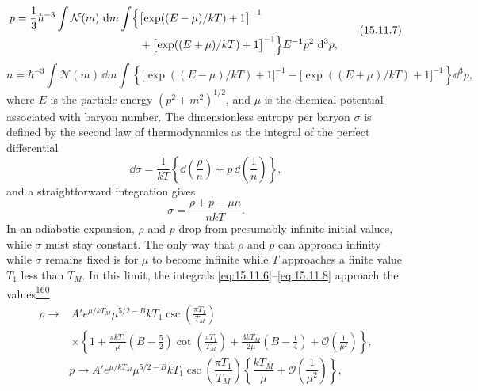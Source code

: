 \begin{equation}
  \begin{split}
  p
  =
  \frac13\hbar^{-3}
  \int\mathcal N(m)\,\mathop{}\!\mathrm{d} m
  \int
  \Bigl\{
    &\bigl[\exp((E-\mu)/kT)+1\bigr]^{-1}\\
    &+\bigl[\exp((E+\mu)/kT)+1\bigr]^{-1}
  \Bigr\}
  E^{-1}p^2\,\mathop{}\!\mathrm{d}^3p,
  \end{split}
  \tag{15.11.7}\label{eq:15.11.7}
\end{equation}
\begin{equation}
  n
  =
  \hbar^{-3}
  \int\mathcal N(m)\,\dd m
  \int
  \left\{
    \bigl[\exp((E-\mu)/kT)+1\bigr]^{-1}
    -\bigl[\exp((E+\mu)/kT)+1\bigr]^{-1}
  \right\}
  \dd^3p,
  \tag{15.11.8}\label{eq:15.11.8}
\end{equation}
where \(E\) is the particle energy \((p^2+m^2)^{1/2}\), and \(\mu\) is
the chemical potential associated with baryon number. The dimensionless
entropy per baryon \(\sigma\) is defined by the second law of thermodynamics
as the integral of the perfect differential
\[
  \dd\sigma
  =
  \frac1{kT}
  \left\{
    \dd\left(\frac\rho n\right)
    +p\,\dd\left(\frac1n\right)
  \right\},
\]
and a straightforward integration gives
\begin{equation}
  \sigma=\frac{\rho+p-\mu n}{nkT}.
  \tag{15.11.9}\label{eq:15.11.9}
\end{equation}
In an adiabatic expansion, \(\rho\) and \(p\) drop from presumably infinite
initial values, while \(\sigma\) must stay constant. The only way that
\(\rho\) and \(p\) can approach infinity while \(\sigma\) remains fixed is
for \(\mu\) to become infinite while \(T\) approaches a finite value
\(T_1\) less than \(T_M\). In this limit, the integrals
\eqref{eq:15.11.6}--\eqref{eq:15.11.8} approach the
values\hyperref[ch15-ref-160]{\textsuperscript{160}}
\begin{equation}
  \begin{split}
  \rho
  \longrightarrow{}&
  A'e^{\mu/kT_M}\mu^{5/2-B}kT_1
  \csc\left(\frac{\pi T_1}{T_M}\right)\\
  &\times
  \left\{
    1
    +\frac{\pi kT_1}{\mu}
      \left(B-\frac52\right)
      \cot\left(\frac{\pi T_1}{T_M}\right)
    +\frac{3kT_M}{2\mu}
      \left(B-\frac14\right)
    +\mathcal O\left(\frac1{\mu^2}\right)
  \right\},
  \end{split}
  \tag{15.11.10}\label{eq:15.11.10}
\end{equation}
\begin{equation}
  p
  \longrightarrow
  A'e^{\mu/kT_M}\mu^{5/2-B}kT_1
  \csc\left(\frac{\pi T_1}{T_M}\right)
  \left\{
    \frac{kT_M}{\mu}
    +\mathcal O\left(\frac1{\mu^2}\right)
  \right\},
  \tag{15.11.11}\label{eq:15.11.11}
\end{equation}
